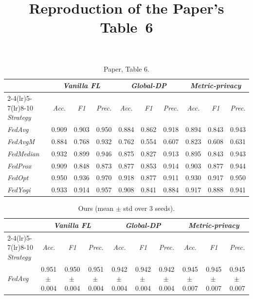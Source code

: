 \documentclass[11pt]{article}
\title{Reproduction of the Paper's Table~6}
\date{}
\begin{document}
\maketitle
\thispagestyle{empty}

\begin{table}[h]
\centering
\caption{Paper, Table 6.}
\begin{tabular}{l ccc ccc ccc}
\toprule
& \multicolumn{3}{c}{\emph{Vanilla FL}} & \multicolumn{3}{c}{\emph{Global-DP}} & \multicolumn{3}{c}{\emph{Metric-privacy}} \\
\cmidrule(lr){2-4}\cmidrule(lr){5-7}\cmidrule(lr){8-10}
\emph{Strategy} & \emph{Acc.} & \emph{F1} & \emph{Prec.} & \emph{Acc.} & \emph{F1} & \emph{Prec.} & \emph{Acc.} & \emph{F1} & \emph{Prec.} \\
\midrule
\emph{FedAvg} & 0.909 & 0.903 & 0.950 & 0.884 & 0.862 & 0.918 & 0.894 & 0.843 & 0.943 \\
\emph{FedAvgM} & 0.884 & 0.768 & 0.932 & 0.762 & 0.554 & 0.607 & 0.823 & 0.608 & 0.631 \\
\emph{FedMedian} & 0.932 & 0.899 & 0.946 & 0.875 & 0.827 & 0.913 & 0.895 & 0.843 & 0.943 \\
\emph{FedProx} & 0.909 & 0.848 & 0.873 & 0.877 & 0.853 & 0.914 & 0.903 & 0.877 & 0.944 \\
\emph{FedOpt} & 0.950 & 0.936 & 0.970 & 0.918 & 0.877 & 0.911 & 0.930 & 0.917 & 0.950 \\
\emph{FedYogi} & 0.933 & 0.914 & 0.957 & 0.908 & 0.841 & 0.884 & 0.917 & 0.888 & 0.941 \\
\bottomrule
\end{tabular}
\end{table}

\begin{table}[h]
\centering
\caption{Ours (mean $\pm$ std over 3 seeds).}
\begin{tabular}{l ccc ccc ccc}
\toprule
& \multicolumn{3}{c}{\emph{Vanilla FL}} & \multicolumn{3}{c}{\emph{Global-DP}} & \multicolumn{3}{c}{\emph{Metric-privacy}} \\
\cmidrule(lr){2-4}\cmidrule(lr){5-7}\cmidrule(lr){8-10}
\emph{Strategy} & \emph{Acc.} & \emph{F1} & \emph{Prec.} & \emph{Acc.} & \emph{F1} & \emph{Prec.} & \emph{Acc.} & \emph{F1} & \emph{Prec.} \\
\midrule
\emph{FedAvg} & 0.951 {\scriptsize$\pm$\,0.004} & 0.950 {\scriptsize$\pm$\,0.004} & 0.951 {\scriptsize$\pm$\,0.004} & 0.942 {\scriptsize$\pm$\,0.004} & 0.942 {\scriptsize$\pm$\,0.004} & 0.942 {\scriptsize$\pm$\,0.004} & 0.945 {\scriptsize$\pm$\,0.007} & 0.945 {\scriptsize$\pm$\,0.007} & 0.945 {\scriptsize$\pm$\,0.007} \\
\bottomrule
\end{tabular}
\end{table}
\end{document}
